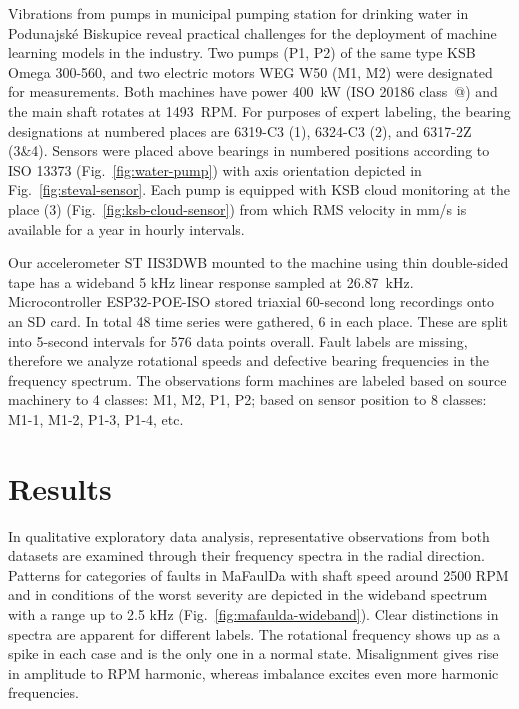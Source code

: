 \documentclass{llncs}
\makeatletter
\newcommand*{\rom}[1]{\expandafter\@slowromancap\romannumeral #1@}
\makeatother
\begin{document}
Vibrations from pumps in municipal pumping station for drinking water in Podunajské Biskupice reveal practical challenges for the deployment of machine learning models in the industry. Two pumps (P1, P2) of the same type KSB Omega 300-560, and two electric motors WEG W50 (M1, M2) were designated for measurements. Both machines have power 400~kW (ISO 20186 class~\rom{3}) and the main shaft rotates at 1493~RPM. For purposes of expert labeling, the bearing designations at numbered places are 6319-C3 (1), 6324-C3 (2), and 6317-2Z (3\&4). Sensors were placed above bearings in numbered positions according to ISO 13373 (Fig.~\ref{fig:water-pump}) with axis orientation depicted in Fig.~\ref{fig:steval-sensor}. Each pump is equipped with KSB cloud monitoring at the place (3) (Fig.~\ref{fig:ksb-cloud-sensor}) from which RMS velocity in mm/s is available for a year in hourly intervals. 

Our accelerometer ST IIS3DWB mounted to the machine using thin double-sided tape has a wideband 5 kHz linear response sampled at 26.87~kHz. Microcontroller ESP32-POE-ISO stored triaxial 60-second long recordings onto an SD card. In total 48 time series were gathered, 6 in each place. These are split into 5-second intervals for 576 data points overall. Fault labels are missing, therefore we analyze rotational speeds and defective bearing frequencies in the frequency spectrum. The observations form machines are labeled based on source machinery to 4 classes: M1, M2, P1, P2; based on sensor position to 8 classes: M1-1, M1-2, P1-3, P1-4, etc.

\section{Results}
In qualitative exploratory data analysis, representative observations from both datasets are examined through their frequency spectra in the radial direction. Patterns for categories of faults in MaFaulDa with shaft speed around 2500 RPM and in conditions of the worst severity are depicted in the wideband spectrum with a range up to 2.5 kHz (Fig.~\ref{fig:mafaulda-wideband}). Clear distinctions in spectra are apparent for different labels. The rotational frequency shows up as a spike in each case and is the only one in a normal state. Misalignment gives rise in amplitude to  RPM harmonic, whereas imbalance excites even more harmonic frequencies.
\end{document}

